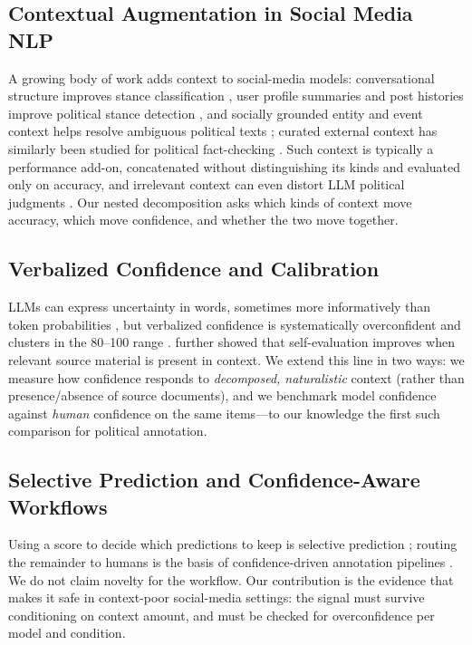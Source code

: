 \documentclass[11pt]{article}
\begin{document}
\subsection{Contextual Augmentation in Social Media NLP}

A growing body of work adds context to social-media models: conversational structure improves stance classification \cite{niu_challenge_2024}, user profile summaries and post histories improve political stance detection \cite{sucu_exploiting_2025}, and socially grounded entity and event context helps resolve ambiguous political texts \cite{pujari_we_2024}; curated external context has similarly been studied for political fact-checking \cite{deverna_large_2025}. Such context is typically a performance add-on, concatenated without distinguishing its kinds and evaluated only on accuracy, and irrelevant context can even distort LLM political judgments \cite{davenia_quantifying_2025}. Our nested decomposition asks which kinds of context move accuracy, which move confidence, and whether the two move together.

\subsection{Verbalized Confidence and Calibration}

LLMs can express uncertainty in words, sometimes more informatively than token probabilities \cite{tian_just_2023}, but verbalized confidence is systematically overconfident and clusters in the 80--100 range \cite{xiong_can_2024}. \citet{kadavath_language_2022} further showed that self-evaluation improves when relevant source material is present in context. We extend this line in two ways: we measure how confidence responds to \emph{decomposed, naturalistic} context (rather than presence/absence of source documents), and we benchmark model confidence against \emph{human} confidence on the same items---to our knowledge the first such comparison for political annotation.

\subsection{Selective Prediction and Confidence-Aware Workflows}

Using a score to decide which predictions to keep is selective prediction \cite{geifman_selective_2017, kamath_selective_2020}; routing the remainder to humans is the basis of confidence-driven annotation pipelines \cite{gligoric_can_2025}. We do not claim novelty for the workflow. Our contribution is the evidence that makes it safe in context-poor social-media settings: the signal must survive conditioning on context amount, and must be checked for overconfidence per model and condition.
\end{document}
